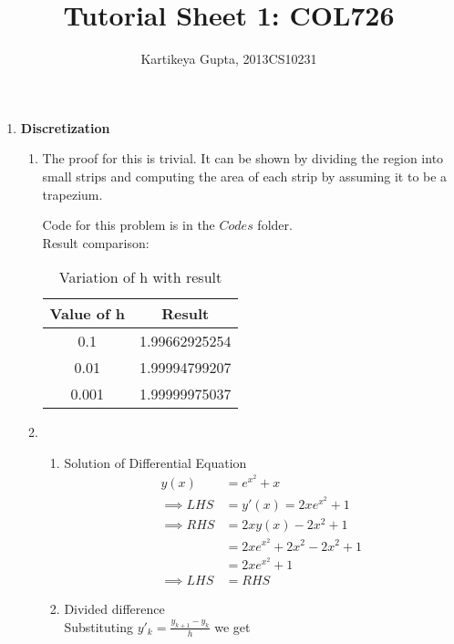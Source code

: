 \documentclass[11pt]{article}
\begin{document}
\author{Kartikeya Gupta, 2013CS10231}
\title{Tutorial Sheet 1: COL726}
\maketitle

\begin{enumerate}
		\item \textbf {Discretization} \\
		\begin{enumerate}
				\item %
						The proof for this is trivial. It can be shown by dividing the region into small strips and computing the area of each strip by assuming it to be a trapezium.

						Code for this problem is in the $Codes$ folder. \\
						Result comparison: \\
						\begin{table}[!htb]
						\centering
						\caption{Variation of h with result}
						\label{my-label}
						\begin{tabular}{|c|c|}
						\hline
						Value of h & Result        \\ \hline
						0.1        & 1.99662925254 \\ \hline
						0.01       & 1.99994799207 \\ \hline
						0.001      & 1.99999975037 \\ \hline
						\end{tabular}
						\end{table}	%
				\item %
						\begin{enumerate}
								\item Solution of Differential Equation
									\begin{align*}
										y(x) &= e^{x^{2}} + x \\
											\implies LHS &= y'(x) = 2xe^{x^{2}} + 1 \\
											\implies RHS &= 2xy(x)-2x^2 + 1 \\
															&= 2xe^{x^{2}} +2x^2 -2x^2 +1 \\
													  &= 2xe^{x^{2}}+1 \\
											\implies LHS &= RHS
									\end{align*}
								\item Divided difference \\ 
										Substituting $y'_{k} = \frac{y_{k+1} - y_k}{h}$ we get \\

\end{enumerate}
\end{enumerate}
\end{enumerate}
\end{document}
